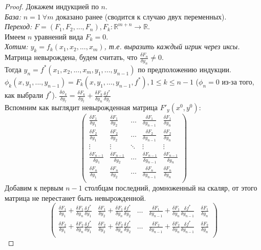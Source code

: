 \documentclass{article}
\theoremstyle{indented}
\theoremstyle{definition}
\theoremstyle{remark}
\newcommand{\df}[2]{\frac{\delta #1}{\delta #2}}
\begin{document}
\begin{proof}
    Докажем индукцией по $n$.\\
    \textit{База: } $n=1 \ \forall m$ доказано ранее (сводится к случаю двух переменных).\\
    \textit{Переход: } $F=(F_1, F_2, ... , F_n), F_k: \mathbb{R}^{m+n} \to \mathbb{R}$.\\
    Имеем $n$ уравнений вида $F_k = 0$.\\ 
    \textit{Хотим: $y_k=f_k(x_1, x_2, ..., x_m)$, т.е. выразить каждый игрик через иксы.}\\
    Матрица невырождена, будем считать, что $\frac{\delta F_n}{\delta y_n} \not= 0$.\\
    Тогда $y_n = f^*(x_1, x_2, ... , x_m, y_1, ... , y_{n-1})$
    по предположению индукции. \\
    $\phi_k(x,y_1, ..., y_{n-1}) = F_k(x,y_1, ..., y_{n-1}, f^*), 1 \leq k \leq n-1$ ($\phi_n = 0$ из-за того, как выбрали $f^*$).
    $\frac{\delta \phi_k}{\delta y_l} = \frac{\delta F_k}{\delta y_l} + \frac{\delta F_k}{\delta y_n} \frac{\delta f^*}{\delta y_l}$\\
    Вспомним как выглядит невырожденная матрица $F'_y(x^0, y^0)$:
    $$
    \begin{pmatrix}
        \df{F_1}{y_1} & \df{F_1}{y_2} &\ldots & \df{F_1}{y_{n-1}} & \df{F_1}{y_n}\\
        \df{F_2}{y_1} & \df{F_2}{y_2} &\ldots & \df{F_2}{y_{n-1}} & \df{F_2}{y_n}\\
        \vdots                        & \vdots                        &\ddots & \vdots                        &  \vdots                      \\
        \df{F_{n-1}}{y_1} & \df{F_{n-1}}{y_2} &\ldots & \df{F_{n-1}}{y_{n-1}} & \df{F_{n-1}}{y_n}\\
        \df{F_n}{y_1} & \df{F_n}{y_2} &\ldots & \df{F_n}{y_{n-1}} & \df{F_n}{y_n}\\
    \end{pmatrix}    
    $$
    Добавим к первым $n-1$ столбцам последний, домноженный на скаляр, от этого матрица не перестанет быть невырожденной.
    $$
    \begin{pmatrix}
        \df{F_1}{y_1} + \df{F_1}{y_n} \df{f^*}{y_1} & \df{F_1}{y_2} + \df{F_1}{y_n} \df{f^*}{y_2} &\ldots & \df{F_1}{y_{n-1}} + \df{F_1}{y_n} \df{f^*}{y_{n-1}} & \df{F_1}{y_n}\\
        \df{F_2}{y_1} + \df{F_2}{y_n} \df{f^*}{y_1} & \df{F_2}{y_2} + \df{F_2}{y_n} \df{f^*}{y_2} &\ldots & \df{F_2}{y_{n-1}} + \df{F_2}{y_n} \df{f^*}{y_{n-1}} & \df{F_2}{y_n}\\

\end{pmatrix}$$
\end{proof}
\end{document}
